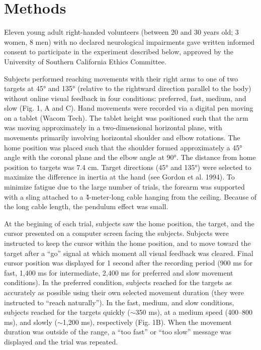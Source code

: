 \section{Methods}
Eleven young adult right-handed volunteers (between 20 and 30 years old; 3 women, 8 men) with no declared neurological impairments gave written informed consent to participate in the experiment described below, approved by the University of Southern California Ethics Committee.

Subjects performed reaching movements with their right arms to one of two targets at \ang{45} and \ang{135} (relative to the rightward direction parallel to the body) without online visual feedback in four conditions: preferred, fast, medium, and slow (Fig. 1, A and C).  
Hand movements were recorded via a digital pen moving on a tablet (Wacom Tech). 
The tablet height was positioned such that the arm was moving approximately in a two-dimensional horizontal plane, with movements primarily involving horizontal shoulder and elbow rotations. 
The home position was placed such that the shoulder formed approximately a \ang{45} angle with the coronal plane and the elbow angle at \ang{90}. 
The distance from home position to targets was 7.4 cm. 
Target directions (\ang{45} and \ang{135}) were selected to maximize the difference in inertia at the hand (see Gordon et al. 1994). 
To minimize fatigue due to the large number of trials, the forearm was supported with a sling attached to a \~4-meter-long cable hanging from the ceiling. 
Because of the long cable length, the pendulum effect was small.

At the begining of each trial, subjects saw the home position, the target, and the cursor presented on a computer screen facing the subjects. 
Subjects were instructed to keep the cursor within the home position, and to move toward the target after a “go” signal at which moment all visual feedback was cleared. 
Final cursor position was displayed for 1 second after the recording period (900 ms for fast, 1,400 ms for intermediate, 2,400 ms for preferred and slow movement conditions). 
In the preferred condition, subjects reached for the targets as accurately as possible using their own selected movement duration (they were instructed to “reach naturally”). 
In the fast, medium, and slow conditions, subjects reached for the targets quickly ($\sim$350 ms), at a medium speed (400--800 ms), and slowly ($\sim$1,200 ms), respectively (Fig. 1B). 
When the movement duration was outside of the range, a “too fast” or “too slow” message was displayed and the trial was repeated.
 
